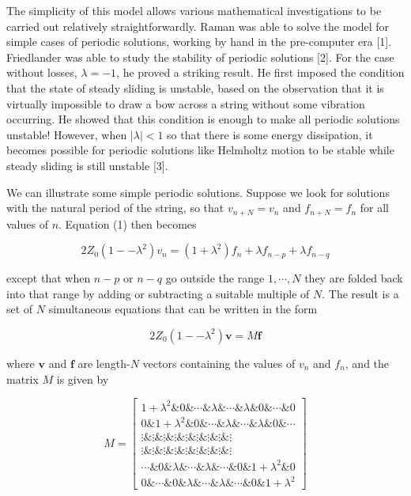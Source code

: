   The simplicity of this model allows various mathematical investigations to be 
  carried out relatively straightforwardly. Raman was able to solve the model 
  for simple cases of periodic solutions, working by hand in the pre-computer 
  era [1]. Friedlander was able to study the stability of periodic solutions 
  [2]. For the case without losses, $\lambda =-1$, he proved a striking result. 
  He first imposed the condition that the state of steady sliding is unstable, 
  based on the observation that it is virtually impossible to draw a bow across 
  a string without some vibration occurring. He showed that this condition is 
  enough to make all periodic solutions unstable! However, when $|\lambda| < 1$ 
  so that there is some energy dissipation, it becomes possible for periodic 
  solutions like Helmholtz motion to be stable while steady sliding is still 
  unstable [3]. 

  We can illustrate some simple periodic solutions. Suppose we look for 
  solutions with the natural period of the string, so that $v_{n+N}=v_n$ and 
  $f_{n+N}=f_n$ for all values of $n$. Equation (1) then becomes 

  $$2 Z_0 (1 -- \lambda^2) v_n = (1+ \lambda^2)f_n + \lambda f_{n-p} + \lambda 
  f_{n-q} \tag{3}$$ 

  except that when $n-p$ or $n-q$ go outside the range $1,\cdots,N$ they are 
  folded back into that range by adding or subtracting a suitable multiple of 
  $N$. The result is a set of $N$ simultaneous equations that can be written in 
  the form 

  $$2 Z_0 (1 -- \lambda^2) \mathbf{v} = M \mathbf{f} \tag{4}$$ 

  where $\mathbf{v}$ and $\mathbf{f}$ are length-$N$ vectors containing the 
  values of $v_n$ and $f_n$, and the matrix $M$ is given by 

  $$M=\begin{bmatrix}1+\lambda^2 \& 0 \& \cdots \& \lambda \& \cdots \& \lambda 
  \& 0 \& \cdots \& 0\\0 \& 1+\lambda^2 \& 0 \& \cdots \& \lambda \& \cdots \& 
  \lambda \& 0 \& \cdots \\ \vdots \& \vdots \& \vdots \& \vdots \& \vdots \& 
  \vdots \& \vdots \& \vdots \& \vdots\\ \vdots \& \vdots \& \vdots \& \vdots 
  \& \vdots \& \vdots \& \vdots \& \vdots \& \vdots \\\cdots \& 0 \& \lambda \& 
  \cdots \& \lambda \& \cdots \& 0 \& 1+\lambda^2 \& 0\\0 \& \cdots \& 0 \& 
  \lambda \& \cdots \& \lambda \& \cdots \& 0 \& 1+\lambda^2 \end{bmatrix} 
  \tag{5}$$ 

